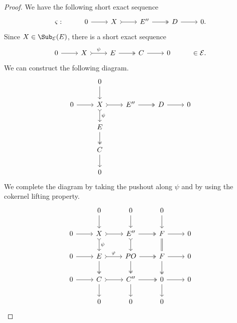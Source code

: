 \begin{proof}
We have the following short exact sequence
 \[\begin{tikzcd}
	\varsigma: & 0 & X & E'' & D&  0.
	\arrow[from=1-2, to=1-3]
	\arrow[tail, from=1-3, to=1-4]
	\arrow[two heads,from=1-4, to=1-5]
	\arrow[from=1-5, to=1-6]
\end{tikzcd}\] Since $X \in \Sub_\mathcal{E}(E)$,
there is a short exact sequence \[\begin{tikzcd}
	0 & X & E  & C &  0& \in \mathcal{E}.
	\arrow[from=1-1, to=1-2]
	\arrow[tail,"\psi", from=1-2, to=1-3]
	\arrow[,two heads,from=1-3, to=1-4]
	\arrow[from=1-4, to=1-5]
\end{tikzcd} \]
We can construct the following diagram.
\[\begin{tikzcd}
         & 0 & & &  \\
	0 & X & E''  & D &  0 \\
      & E & &  & \\
      & C & & & \\
       & 0 & & & 
	\arrow[from=2-1, to=2-2]
	\arrow[tail, from=2-2, to=2-3]
	\arrow[two heads,from=2-3, to=2-4]
	\arrow[from=2-4, to=2-5]
        \arrow[from=4-2, to=5-2]
	\arrow[two heads, from=3-2, to=4-2]
	\arrow[tail,"\psi",from=2-2, to=3-2]
	\arrow[from=1-2, to=2-2]
\end{tikzcd} \]
We complete the diagram by taking the pushout along $\psi$ and by using the cokernel lifting property. 
\[\begin{tikzcd}
         & 0 & 0 & 0 &  \\
	0 & X & E''  & F &  0 \\
     0 & E & PO & F & 0 \\
      0 & C & C'' & 0 & 0 \\
       & 0 & 0 & 0 & 
	\arrow[from=2-1, to=2-2]
	\arrow[tail, from=2-2, to=2-3]
	\arrow[two heads,from=2-3, to=2-4]
	\arrow[from=2-4, to=2-5]
        \arrow[from=3-1, to=3-2]
	\arrow[tail,"\varphi", from=3-2, to=3-3]
	\arrow[two heads,from=3-3, to=3-4]
	\arrow[from=3-4, to=3-5]
        \arrow[from=4-1, to=4-2]
	\arrow[tail, from=4-2, to=4-3]
	\arrow[two heads,from=4-3, to=4-4]
	\arrow[from=4-4, to=4-5]
        \arrow[from=4-2, to=5-2]
	\arrow[two heads, from=3-2, to=4-2]
	\arrow[tail,"\psi",from=2-2, to=3-2]
	\arrow[from=1-2, to=2-2]
        \arrow[from=4-3, to=5-3]
	\arrow[two heads, from=3-3, to=4-3]
	\arrow[tail,from=2-3, to=3-3]
	\arrow[from=1-3, to=2-3]
        \arrow[from=4-4, to=5-4]
	\arrow[two heads, from=3-4, to=4-4]
	\arrow[equals,from=2-4, to=3-4]
	\arrow[from=1-4, to=2-4]
\end{tikzcd} \]


\end{proof}
